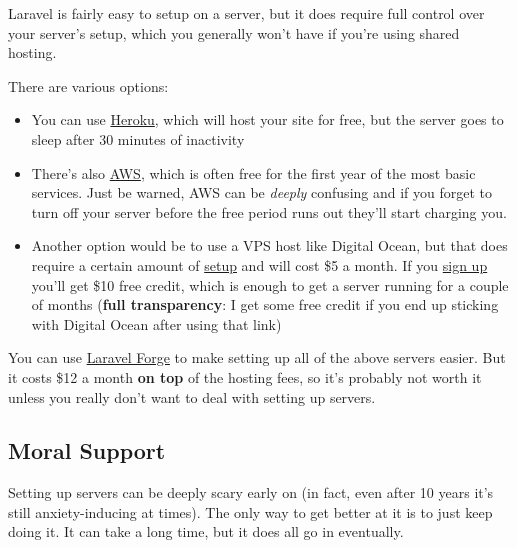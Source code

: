 Laravel is fairly easy to setup on a server, but it does require full control over your server's setup, which you generally won't have if you're using shared hosting.

There are various options:

\begin{itemize}
    \item You can use \href{https://devcenter.heroku.com/articles/getting-started-with-laravel}{Heroku}, which will host your site for free, but the server goes to sleep after 30 minutes of inactivity

    \item There's also \href{https://docs.aws.amazon.com/elasticbeanstalk/latest/dg/php-laravel-tutorial.html}{AWS}, which is often free for the first year of the most basic services. Just be warned, AWS can be \textit{deeply} confusing and if you forget to turn off your server before the free period runs out they'll start charging you.

    \item Another option would be to use a VPS host like Digital Ocean, but that does require a certain amount of \href{https://www.digitalocean.com/community/tutorials/how-to-deploy-a-laravel-application-with-nginx-on-ubuntu-16-04}{setup} and will cost \$5 a month. If you \href{https://m.do.co/c/41f18e2fa188}{sign up} you'll get \$10 free credit, which is enough to get a server running for a couple of months (\textbf{full transparency}: I get some free credit if you end up sticking with Digital Ocean after using that link)
\end{itemize}

You can use \href{https://forge.laravel.com/}{Laravel Forge} to make setting up all of the above servers easier. But it costs \$12 a month \textbf{on top} of the hosting fees, so it's probably not worth it unless you really don't want to deal with setting up servers.

\subsection*{Moral Support}

Setting up servers can be deeply scary early on (in fact, even after 10 years it's still anxiety-inducing at times). The only way to get better at it is to just keep doing it. It can take a long time, but it does all go in eventually.
